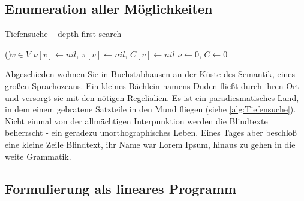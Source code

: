 \documentclass[12pt,a4paper,twoside]{scrartcl}
\numberwithin{equation}{section}
\begin{document}
\subsection{Enumeration aller Möglichkeiten}

\begin{algorithm}
  \caption{Tiefensuche -- depth-first search}\label{alg:Tiefensuche}


  \While(){$v \in V$}{
    $\nu[v] \leftarrow nil$, $\pi[v] \leftarrow nil$, $C[v] \leftarrow nil$ 
  }
  $\nu \leftarrow 0$, $C \leftarrow 0$ 




\end{algorithm}

Abgeschieden wohnen Sie in Buchstabhausen an der Küste des Semantik, eines großen Sprachozeans. Ein kleines Bächlein namens Duden fließt durch ihren Ort und versorgt sie mit den nötigen Regelialien. Es ist ein paradiesmatisches Land, in dem einem gebratene Satzteile in den Mund fliegen (siehe \autoref{alg:Tiefensuche}). Nicht einmal von der allmächtigen Interpunktion werden die Blindtexte beherrscht - ein geradezu unorthographisches Leben. Eines Tages aber beschloß eine kleine Zeile Blindtext, ihr Name war Lorem Ipsum, hinaus zu gehen in die weite Grammatik.

\subsection{Formulierung als lineares Programm}
\end{document}
